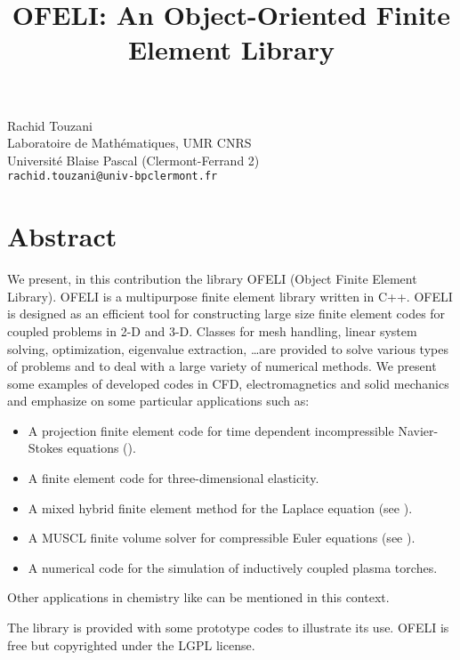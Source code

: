 \title{OFELI: An Object-Oriented Finite Element Library}
\author{} \institute{}
\maketitle

\begin{center}
{\large Rachid Touzani}\\
Laboratoire de Math\'ematiques, UMR CNRS\\
Universit\'e Blaise Pascal (Clermont-Ferrand 2)\\
{\tt rachid.touzani@univ-bpclermont.fr}
\end{center}

\section*{Abstract}
We present, in this contribution the library OFELI  (Object Finite Element Library). OFELI is a multipurpose finite element library written in C++. OFELI is designed as an efficient tool for constructing large size finite element codes for coupled problems in 2-D and 3-D. Classes for mesh handling, linear system solving, optimization, eigenvalue extraction, \ldots are provided to solve various types of problems and to deal with a large variety of numerical methods. We present some examples of developed codes in CFD, electromagnetics and solid mechanics and emphasize on some particular applications such as:
\begin{itemize}
\item A projection finite element code for time dependent incompressible Navier-Stokes equations (\cite{PhC}).
\item A finite element code for three-dimensional elasticity.
\item A mixed hybrid finite element method for the Laplace equation (see \cite{Djenno}).
\item A MUSCL finite volume solver for compressible Euler equations (see \cite{CC,CR}).
\item A numerical code for the simulation of inductively coupled plasma torches.
\end{itemize}
Other applications in chemistry like \cite{SSDTZ} can be mentioned in this context.

The library is provided with some prototype codes to illustrate its use. OFELI is free but copyrighted under the LGPL license.

